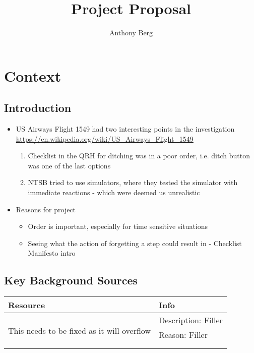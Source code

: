 \documentclass[a4paper]{article}
\author{Anthony Berg}
\title{Project Proposal}
\begin{document}
\begin{titlepage}
    \clearpage\maketitle
    \thispagestyle{empty}
\end{titlepage}

\section{Context}
\subsection{Introduction}
\begin{itemize}
    \item US Airways Flight 1549 had two interesting points in the investigation
        \url{https://en.wikipedia.org/wiki/US_Airways_Flight_1549}
        \begin{enumerate}
            \item Checklist in the QRH for ditching was in a poor order,
                i.e. ditch button was one of the last options
            \item NTSB tried to use simulators, where they tested
                the simulator with immediate reactions - which were
                deemed us unrealistic
        \end{enumerate}
    \item Reasons for project
        \begin{itemize}
            \item Order is important, especially for time sensitive
                situations
            \item Seeing what the action of forgetting a step could
                result in - Checklist Manifesto intro
        \end{itemize}
\end{itemize}

\subsection{Key Background Sources}
\begin{tabularx}{\linewidth}{p{5em} X}
    \toprule
    Resource & Info \\
    \midrule
    \multirow{4}{*}{\parbox{5em}{This needs to be fixed as it will overflow}}
    & Description: Filler \\
    & Reason: Filler \\ & \\ & \\
    \bottomrule
\end{tabularx}
\end{document}
